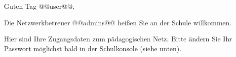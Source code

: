 Guten Tag @@user@@,

\vspace{2mm}

Die Netzwerkbetreuer @@admins@@ heißen Sie an der Schule willkommen.

\vspace{2mm}

Hier sind Ihre Zugangsdaten zum pädagogischen Netz. Bitte ändern Sie Ihr Passwort möglichst bald in der Schulkonsole (siehe unten). 


